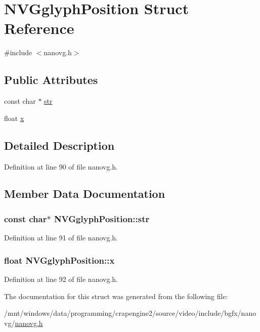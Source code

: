 \hypertarget{struct_n_v_gglyph_position}{\section{N\+V\+Gglyph\+Position Struct Reference}
\label{struct_n_v_gglyph_position}
}


{\ttfamily \#include $<$nanovg.\+h$>$}

\subsection*{Public Attributes}
\begin{DoxyCompactItemize}
\item 
const char $\ast$ \hyperlink{struct_n_v_gglyph_position_a62e56b71765965db1a72812af0e733f1}{str}
\item 
float \hyperlink{struct_n_v_gglyph_position_a45c4fbe8ff3c9e654b681fd57588037e}{x}
\end{DoxyCompactItemize}


\subsection{Detailed Description}


Definition at line 90 of file nanovg.\+h.



\subsection{Member Data Documentation}
\hypertarget{struct_n_v_gglyph_position_a62e56b71765965db1a72812af0e733f1}{
\subsubsection[{str}]{\setlength{\rightskip}{0pt plus 5cm}const char$\ast$ N\+V\+Gglyph\+Position\+::str}}\label{struct_n_v_gglyph_position_a62e56b71765965db1a72812af0e733f1}


Definition at line 91 of file nanovg.\+h.

\hypertarget{struct_n_v_gglyph_position_a45c4fbe8ff3c9e654b681fd57588037e}{
\subsubsection[{x}]{\setlength{\rightskip}{0pt plus 5cm}float N\+V\+Gglyph\+Position\+::x}}\label{struct_n_v_gglyph_position_a45c4fbe8ff3c9e654b681fd57588037e}


Definition at line 92 of file nanovg.\+h.



The documentation for this struct was generated from the following file\+:\begin{DoxyCompactItemize}
\item 
/mnt/windows/data/programming/crapengine2/source/video/include/bgfx/nanovg/\hyperlink{nanovg_8h}{nanovg.\+h}\end{DoxyCompactItemize}
